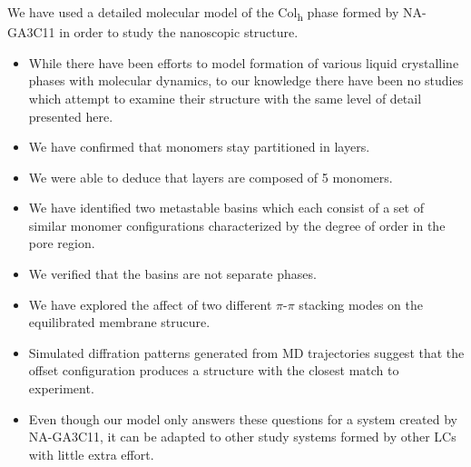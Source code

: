 \documentclass{article}
\begin{document}
  We have used a detailed molecular model of the Col\textsubscript{h} phase formed by NA-GA3C11
  in order to study the nanoscopic structure.
  \begin{itemize}
  	\item While there have been efforts to model formation of various liquid crystalline 
	phases with molecular dynamics, to our knowledge there have been no studies which 
	attempt to examine their structure with the same level of detail presented here.
	\item We have confirmed that monomers stay partitioned in layers.
	\item We were able to deduce that layers are composed of 5 monomers.
	\item We have identified two metastable basins which each consist of a set of 
	similar monomer configurations characterized by the degree of order in the pore region.
	\item We verified that the basins are not separate phases.
	\item We have explored the affect of two different $\pi$-$\pi$ stacking modes on the equilibrated
	membrane strucure. 
	\item Simulated diffration patterns generated from MD trajectories suggest that
	the offset configuration produces a structure with the closest match to experiment. 
	\item Even though our model only answers these questions for a system created by 
	NA-GA3C11, it can be adapted to other study systems formed by other LCs with 
	little extra effort. 
  \end{itemize}
  
\clearpage

\end{document}
